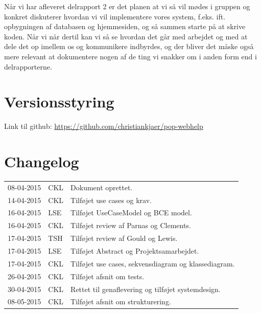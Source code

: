 \documentclass[11pt, a4paper]{article}
\begin{document}
Når vi har afleveret delrapport 2 er det planen at vi så vil mødes i gruppen og konkret diskuterer hvordan vi vil implementere vores system, f.eks. ift. opbygningen af databasen og hjemmesiden, og så sammen starte på at skrive koden. Når vi når dertil kan vi så se hvordan det går med arbejdet og med at dele det op imellem os og kommunikere indbyrdes, og der bliver det måske også mere relevant at dokumentere nogen af de ting vi snakker om i anden form end i delrapporterne.

\newpage
\appendix
\section{Versionsstyring}
Link til github: \url{https://github.com/christiankjaer/pop-webhelp}

\section{Changelog}
\begin{tabular}{l l l}
08-04-2015 & CKL & Dokument oprettet. \\
14-04-2015 & CKL & Tilføjet use cases og krav. \\
16-04-2015 & LSE & Tilføjet UseCaseModel og BCE model. \\
16-04-2015 & CKL & Tilføjet review af Parnas og Clements. \\
17-04-2015 & TSH & Tilføjet review af Gould og Lewis. \\
17-04-2015 & LSE & Tilføjet Abstract og Projektsamarbejdet. \\
17-04-2015 & CKL & Tilføjet use cases, sekvensdiagram og klassediagram. \\
26-04-2015 & CKL & Tilføjet afsnit om tests. \\
30-04-2015 & CKL & Rettet til genaflevering og tilføjet systemdesign. \\
08-05-2015 & CKL & Tilføjet afsnit om strukturering. \\
\end{tabular}
\end{document}
